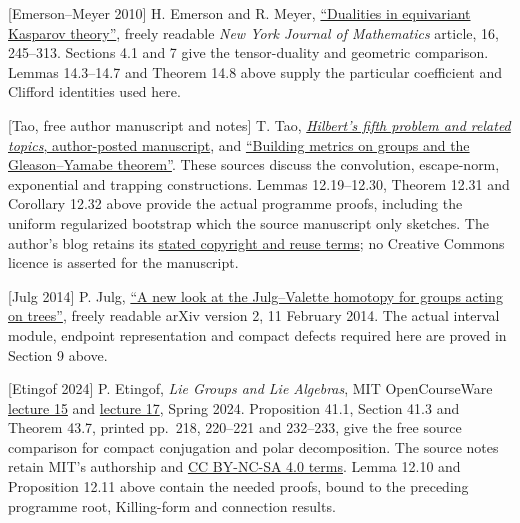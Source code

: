 \documentclass[
  11pt,
]{article}
\begin{document}
{[}Emerson--Meyer 2010{]} H. Emerson and R. Meyer,
\href{https://nyjm.albany.edu/j/2010/16-12v.pdf}{``Dualities in
equivariant Kasparov theory''}, freely readable \emph{New York Journal
of Mathematics} article, 16, 245--313. Sections 4.1 and 7 give the
tensor-duality and geometric comparison. Lemmas 14.3--14.7 and Theorem
14.8 above supply the particular coefficient and Clifford identities
used here.

{[}Tao, free author manuscript and notes{]} T. Tao,
\href{https://terrytao.wordpress.com/wp-content/uploads/2012/03/hilbert-book.pdf}{\emph{Hilbert's
fifth problem and related topics}, author-posted manuscript}, and
\href{https://terrytao.wordpress.com/2011/10/04/254a-notes-4-building-metrics-on-groups-and-the-gleason-yamabe-theorem/}{``Building
metrics on groups and the Gleason--Yamabe theorem''}. These sources
discuss the convolution, escape-norm, exponential and trapping
constructions. Lemmas 12.19--12.30, Theorem 12.31 and Corollary 12.32
above provide the actual programme proofs, including the uniform
regularized bootstrap which the source manuscript only sketches. The
author's blog retains its
\href{https://terrytao.wordpress.com/about/}{stated copyright and reuse
terms}; no Creative Commons licence is asserted for the manuscript.

{[}Julg 2014{]} P. Julg, \href{https://arxiv.org/pdf/1310.6941v2}{``A
new look at the Julg--Valette homotopy for groups acting on trees''},
freely readable arXiv version 2, 11 February 2014. The actual interval
module, endpoint representation and compact defects required here are
proved in Section 9 above.

{[}Etingof 2024{]} P. Etingof, \emph{Lie Groups and Lie Algebras}, MIT
OpenCourseWare
\href{https://ocw.mit.edu/courses/18-755-lie-groups-and-lie-algebras-ii-spring-2024/mit18_755_s24_lec15.pdf}{lecture
15} and
\href{https://ocw.mit.edu/courses/18-755-lie-groups-and-lie-algebras-ii-spring-2024/mit18_755_s24_lec17.pdf}{lecture
17}, Spring 2024. Proposition 41.1, Section 41.3 and Theorem 43.7,
printed pp.~218, 220--221 and 232--233, give the free source comparison
for compact conjugation and polar decomposition. The source notes retain
MIT's authorship and
\href{https://creativecommons.org/licenses/by-nc-sa/4.0/}{CC BY-NC-SA
4.0 terms}. Lemma 12.10 and Proposition 12.11 above contain the needed
proofs, bound to the preceding programme root, Killing-form and
connection results.
\end{document}
